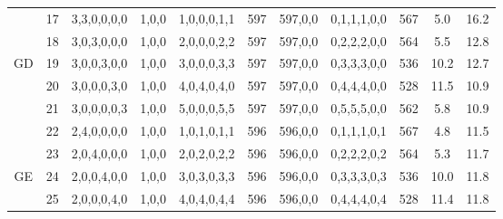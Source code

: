 \documentclass[review,12pt, 3p, times]{elsarticle}
\begin{document}
\begin{longtable}{|c|c|c|c|c|c|c|c|c|c|c|}
	\hline
	        & 17      & 3,3,0,0,0,0                         & 1,0,0                                & 1,0,0,0,1,1          & 597          & 597,0,0               & 0,1,1,1,0,0                                & 567                     & 5.0    &  16.2     \\
	        & 18      & 3,0,3,0,0,0                         & 1,0,0                                & 2,0,0,0,2,2          & 597          & 597,0,0               & 0,2,2,2,0,0                                & 564                     & 5.5   &  12.8     \\
	GD      & 19      & 3,0,0,3,0,0                         & 1,0,0                                & 3,0,0,0,3,3          & 597          & 597,0,0               & 0,3,3,3,0,0                                & 536                     & 10.2   &  12.7    \\
	        & 20      & 3,0,0,0,3,0                         & 1,0,0                                & 4,0,4,0,4,0          & 597          & 597,0,0               & 0,4,4,4,0,0                                & 528                     & 11.5   &  10.9    \\
	        & 21      & 3,0,0,0,0,3                         & 1,0,0                                & 5,0,0,0,5,5          & 597          & 597,0,0               & 0,5,5,5,0,0                                & 562                     & 5.8     &  10.9     \\
	\hline
	        & 22      & 2,4,0,0,0,0                         & 1,0,0                                & 1,0,1,0,1,1          & 596          & 596,0,0               & 0,1,1,1,0,1                                & 567                     & 4.8    &  11.5     \\
	        & 23      & 2,0,4,0,0,0                         & 1,0,0                                & 2,0,2,0,2,2          & 596          & 596,0,0               & 0,2,2,2,0,2                                & 564                     & 5.3    &  11.7     \\
	GE      & 24      & 2,0,0,4,0,0                         & 1,0,0                                & 3,0,3,0,3,3          & 596          & 596,0,0               & 0,3,3,3,0,3                                & 536                     & 10.0   &  11.8     \\
	        & 25      & 2,0,0,0,4,0                         & 1,0,0                                & 4,0,4,0,4,4          & 596          & 596,0,0               & 0,4,4,4,0,4                                & 528                     & 11.4    &  11.8    \\

\end{longtable}
\end{document}
